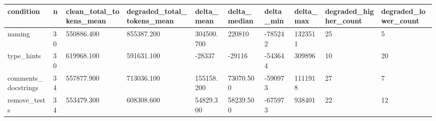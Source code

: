 \begin{tabular}{llllllllll}
\toprule
condition & n & clean\_total\_tokens\_mean & degraded\_total\_tokens\_mean & delta\_mean & delta\_median & delta\_min & delta\_max & degraded\_higher\_count & degraded\_lower\_count \\
\midrule
naming & 30 & 550886.400 & 855387.200 & 304500.700 & 220810 & -785242 & 1323511 & 25 & 5 \\
type\_hints & 30 & 619968.100 & 591631.100 & -28337 & -29116 & -543644 & 309896 & 10 & 20 \\
comments\_docstrings & 34 & 557877.900 & 713036.100 & 155158.200 & 73070.500 & -590973 & 1111918 & 27 & 7 \\
remove\_tests & 34 & 553479.300 & 608308.600 & 54829.300 & 58239.500 & -675973 & 938401 & 22 & 12 \\
\bottomrule
\end{tabular}
